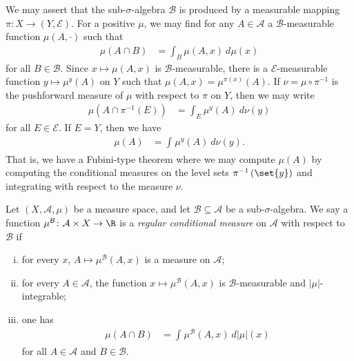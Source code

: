 \documentclass[10pt]{mypackage}
\begin{document}
We may assert that the sub-$\sigma$-algebra $ \mathcal{B} $ is produced by a measurable mapping $\pi\colon X\to \left( Y,\mathcal{E} \right)$. For a positive $\mu$, we may find for any $A\in \mathcal{A}$ a $\mathcal{B}$-measurable function $\mu\left( A,\cdot \right)$ such that
\begin{align*}
  \mu\left( A\cap B \right) &= \int_{B}^{} \mu\left( A,x \right)\:d\mu(x)
\end{align*}
for all $B\in \mathcal{B}$. Since $x\mapsto \mu\left( A,x \right)$ is $\mathcal{B}$-measurable, there is a $\mathcal{E}$-measurable function $y\mapsto \mu^y\left( A \right)$ on $Y$ such that $\mu\left( A,x \right) = \mu^{\pi(x)}\left( A \right)$. If $\nu = \mu\circ \pi^{-1}$ is the pushforward measure of $\mu$ with respect to $\pi$ on $Y$, then we may write
\begin{align*}
  \mu\left( A\cap \pi^{-1}\left( E \right) \right) &= \int_{E}^{} \mu^y(A)\:d\nu(y)
\end{align*}
for all $E\in \mathcal{E}$. If $E = Y$, then we have
\begin{align*}
  \mu(A) &= \int_{}^{} \mu^y(A)\:d\nu(y).
\end{align*}
That is, we have a Fubini-type theorem where we may compute $\mu\left( A \right)$ by computing the conditional measures on the level sets $\pi^{-1}\left( \set{y} \right)$ and integrating with respect to the measure $\nu$.
\begin{definition}
  Let $\left( X,\mathcal{A},\mu \right)$ be a measure space, and let $\mathcal{B}\subseteq \mathcal{A}$ be a sub-$\sigma$-algebra. We say a function $\mu^{\mathcal{B}}\colon \mathcal{A}\times X\to \R$ is a \textit{regular conditional measure} on $\mathcal{A}$ with respect to $ \mathcal{B} $ if
  \begin{enumerate}[(i)]
    \item for every $x$, $A\mapsto \mu^{\mathcal{B}}\left( A,x \right)$ is a measure on $\mathcal{A}$;
    \item for every $A\in \mathcal{A}$, the function $x\mapsto \mu^{\mathcal{B}}\left( A,x \right)$ is $\mathcal{B}$-measurable and $\left\vert \mu \right\vert$-integrable;
    \item one has
      \begin{align*}
        \mu\left( A\cap B \right) &= \int_{}^{} \mu^{\mathcal{B}}\left( A,x \right)\:d\left\vert \mu \right\vert(x)
      \end{align*}
      for all $A\in \mathcal{A}$ and $B\in \mathcal{B}$.
  \end{enumerate}
\end{definition}
\end{document}
